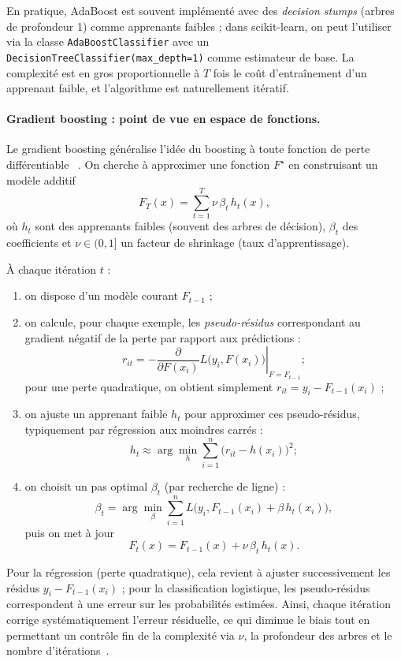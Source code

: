 En pratique, AdaBoost est souvent implémenté avec des \emph{decision stumps} (arbres de
profondeur 1) comme apprenants faibles ; dans scikit-learn, on peut l'utiliser via la classe
\texttt{AdaBoostClassifier} avec un \texttt{DecisionTreeClassifier(max\_depth=1)} comme estimateur
de base. La complexité est en gros proportionnelle à $T$ fois le coût d'entraînement d'un
apprenant faible, et l'algorithme est naturellement itératif.

\paragraph{Gradient boosting : point de vue en espace de fonctions.}
Le gradient boosting généralise l'idée du boosting à toute fonction de perte différentiable
~\cite{friedman_gbm_2001}. On cherche à approximer une fonction $F^\star$ en construisant un
modèle additif
\[
  F_T(x) = \sum_{t=1}^T \nu\,\beta_t\,h_t(x),
\]
où $h_t$ sont des apprenants faibles (souvent des arbres de décision), $\beta_t$ des coefficients
et $\nu \in (0,1]$ un facteur de \og shrinkage \fg{} (taux d'apprentissage).

À chaque itération $t$ :
\begin{enumerate}
  \item on dispose d'un modèle courant $F_{t-1}$ ;
  \item on calcule, pour chaque exemple, les \emph{pseudo-résidus} correspondant au gradient
  négatif de la perte par rapport aux prédictions :
  \[
    r_{it}
    = -\left.\frac{\partial}{\partial F(x_i)} L\bigl(y_i, F(x_i)\bigr)\right|_{F = F_{t-1}};
  \]
  pour une perte quadratique, on obtient simplement $r_{it} = y_i - F_{t-1}(x_i)$ ;

  \item on ajuste un apprenant faible $h_t$ pour approximer ces pseudo-résidus, typiquement par
  régression aux moindres carrés :
  \[
    h_t \approx \arg\min_h \sum_{i=1}^n \bigl(r_{it} - h(x_i)\bigr)^2 ;
  \]

  \item on choisit un pas optimal $\beta_t$ (par recherche de ligne) :
  \[
    \beta_t = \arg\min_{\beta} \sum_{i=1}^n
      L\bigl(y_i, F_{t-1}(x_i) + \beta\,h_t(x_i)\bigr),
  \]
  puis on met à jour
  \[
    F_t(x) = F_{t-1}(x) + \nu\,\beta_t\,h_t(x).
  \]
\end{enumerate}

Pour la régression (perte quadratique), cela revient à ajuster successivement les résidus
$y_i - F_{t-1}(x_i)$ ; pour la classification logistique, les pseudo-résidus correspondent à une
erreur sur les probabilités estimées. Ainsi, chaque itération corrige systématiquement l'erreur
résiduelle, ce qui diminue le biais tout en permettant un contrôle fin de la complexité via
$\nu$, la profondeur des arbres et le nombre d'itérations~\cite{friedman_gbm_2001}.

